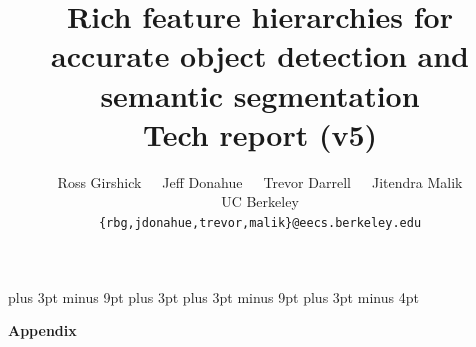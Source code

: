 \documentclass[10pt,twocolumn,letterpaper]{article}
\begin{document}
\abovedisplayskip=12pt plus 3pt minus 9pt
\abovedisplayshortskip=0pt plus 3pt
\belowdisplayskip=12pt plus 3pt minus 9pt
\belowdisplayshortskip=7pt plus 3pt minus 4pt


\title{Rich feature hierarchies for accurate object detection and semantic segmentation\\{\large Tech report (v5)}}

\author{Ross Girshick~~~Jeff Donahue~~~Trevor Darrell~~~Jitendra Malik\\
UC Berkeley\\
{\tt\small \{rbg,jdonahue,trevor,malik\}@eecs.berkeley.edu}
}

\maketitle













\vspace{2em}
{\noindent \Large \bf Appendix}

\appendix



{\small


}
\end{document}
